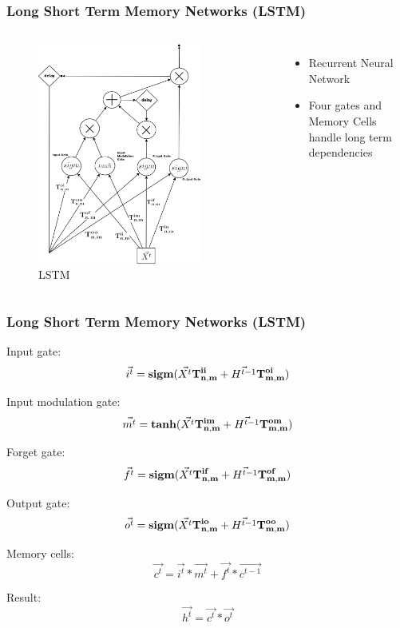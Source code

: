 \documentclass{beamer}
\begin{document}
\begin{frame}
\frametitle{Long Short Term Memory Networks (LSTM)}
\begin{columns}
\begin{figure}[t!]
    \centering
    \includegraphics[width=0.8\textwidth]{../paper/pictures/figures/LSTM.png}
    \caption{LSTM}
    \label{fig:LSTM}
\end{figure}

\begin{itemize}
\item Recurrent Neural Network
\item Four gates and Memory Cells handle long term dependencies
\end{itemize}
\end{columns}
\end{frame}

\begin{frame}
\frametitle{Long Short Term Memory Networks (LSTM)}
Input gate:
$$\vec{i^t} = \bold{sigm}(\vec{X^t}\bold{T_{n,m}^{ii}} + \vec{H^{t-1}}\bold{T_{m,m}^{oi}})$$

Input modulation gate:
	$$\vec{m^t} = \bold{tanh}(\vec{X^t}\bold{T_{n,m}^{im}} + \vec{H^{t-1}}\bold{T_{m,m}^{om}})$$

Forget gate:
	$$\vec{f^t} = \bold{sigm}(\vec{X^t}\bold{T_{n,m}^{if}} + \vec{H^{t-1}}\bold{T_{m,m}^{of}})$$

Output gate:
	$$\vec{o^t} = \bold{sigm}(\vec{X^t}\bold{T_{n,m}^{io}} + \vec{H^{t-1}}\bold{T_{m,m}^{oo}})$$

Memory cells:
	$$\vec{c^t} = \vec{i^t} * \vec{m^t} + \vec{f^t} * \vec{c^{t-1}}$$

Result:
	$$\vec{h^t} = \vec{c^t} * \vec{o^t}$$
\end{frame}
\end{document}
